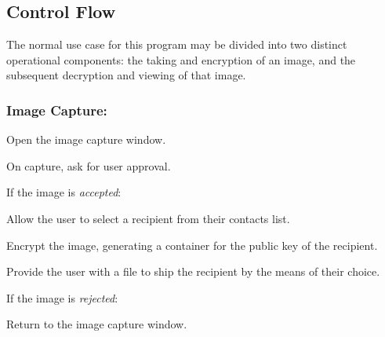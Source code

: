 \documentclass[11pt, a4paper,titlepage]{report}
\begin{document}
\subsection*{Control Flow}
The normal use case for this program may be divided into two distinct operational components: the taking and encryption of an image, and the subsequent decryption and viewing of that image.

\subsubsection{Image Capture:}
\begin{itemize*}
	\item Open the image capture window.
	\item On capture, ask for user approval.
	\begin{itemize*}
		\item[] If the image is \emph{accepted}:
		\begin{itemize*}
			\item Allow the user to select a recipient from their contacts list.
			\item Encrypt the image, generating a container for the public key of the recipient.
                        \item Provide the user with a file to ship the recipient by the means of their choice.
		\end{itemize*}
		\item[] If the image is \emph{rejected}:
		\begin{itemize*}
			\item Return to the image capture window.
		\end{itemize*}
	\end{itemize*}
\end{itemize*}
\end{document}
